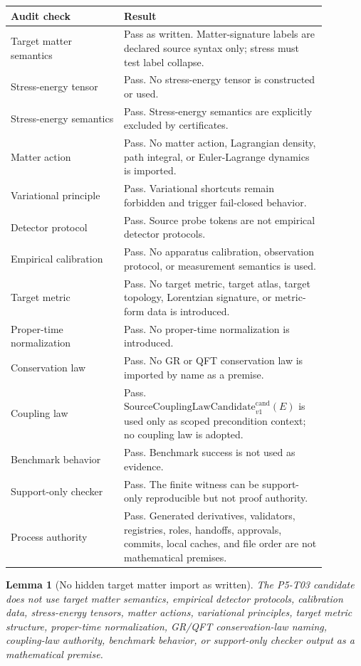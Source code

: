 \documentclass[11pt]{article}
\newcommand{\SCLC}{\mathrm{SourceCouplingLawCandidate}^{\mathrm{cand}}_{v1}}
\newtheorem{lemma}{Lemma}
\begin{document}
\begin{longtable}{p{0.32\linewidth}p{0.56\linewidth}}
\toprule
Audit check & Result \\
\midrule
Target matter semantics & Pass as written. Matter-signature labels are declared source syntax only; stress must test label collapse. \\
Stress-energy tensor & Pass. No stress-energy tensor is constructed or used. \\
Stress-energy semantics & Pass. Stress-energy semantics are explicitly excluded by certificates. \\
Matter action & Pass. No matter action, Lagrangian density, path integral, or Euler-Lagrange dynamics is imported. \\
Variational principle & Pass. Variational shortcuts remain forbidden and trigger fail-closed behavior. \\
Detector protocol & Pass. Source probe tokens are not empirical detector protocols. \\
Empirical calibration & Pass. No apparatus calibration, observation protocol, or measurement semantics is used. \\
Target metric & Pass. No target metric, target atlas, target topology, Lorentzian signature, or metric-form data is introduced. \\
Proper-time normalization & Pass. No proper-time normalization is introduced. \\
Conservation law & Pass. No GR or QFT conservation law is imported by name as a premise. \\
Coupling law & Pass. \(\SCLC(E)\) is used only as scoped precondition context; no coupling law is adopted. \\
Benchmark behavior & Pass. Benchmark success is not used as evidence. \\
Support-only checker & Pass. The finite witness can be support-only reproducible but not proof authority. \\
Process authority & Pass. Generated derivatives, validators, registries, roles, handoffs, approvals, commits, local caches, and file order are not mathematical premises. \\
\bottomrule
\end{longtable}

\begin{lemma}[No hidden target matter import as written]
The P5-T03 candidate does not use target matter semantics, empirical detector
protocols, calibration data, stress-energy tensors, matter actions,
variational principles, target metric structure, proper-time normalization,
GR/QFT conservation-law naming, coupling-law authority, benchmark behavior, or
support-only checker output as a mathematical premise.
\end{lemma}
\end{document}
